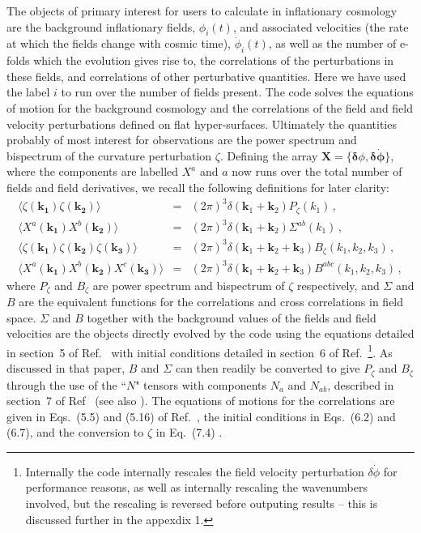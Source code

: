 \documentclass[10pt,
amsmath,amssymb,
aps,prd,nofootinbib,eqsecnum,a4paper]{revtex4}
\begin{document}
The objects of primary interest for users to calculate in inflationary cosmology are the background inflationary 
fields, $\phi_i(t)$, and associated velocities (the rate at which the fields change with cosmic time), $\dot \phi_i(t)$,
as well as the number of e-folds which the evolution gives rise to, the correlations of the perturbations in these fields, 
and correlations of other perturbative quantities.  Here we have used the label $i$ 
to run over the number of fields present. 
The code solves the equations of motion for the background cosmology and 
the correlations of the field and field velocity perturbations 
defined on flat hyper-surfaces. Ultimately the quantities 
probably of most interest for observations are the power spectrum and bispectrum 
of the curvature perturbation $\zeta$. 
Defining the array ${\mathbf X} = \{{\mathbf \delta \phi}, \mathbf {\delta \dot \phi} \}$, where 
the components are labelled $X^a$ and $a$ now runs over the total number of fields and field derivatives, 
we recall the following definitions for later clarity:
\begin{eqnarray}
\langle \zeta(\mathbf{k_1}) \zeta(\mathbf{k_2})  \rangle &=& (2\pi)^3 \delta(\mathbf{k}_1 + \mathbf{k}_2 )
        P_\zeta(k_1) \,, \\
\langle X^a(\mathbf{k_1}) X^b(\mathbf{k_2})  \rangle &=& (2\pi)^3 \delta(\mathbf{k}_1 + \mathbf{k}_2 )
        \Sigma^{ab}(k_1) \,, \\
\langle \zeta(\mathbf{k_1}) \zeta(\mathbf{k_2}) \zeta(\mathbf{k_3}) \rangle &=& (2\pi)^3 \delta(\mathbf{k}_1 + \mathbf{k}_2 + \mathbf{k}_3)
        B_\zeta(k_1, k_2, k_3) \,, \\
\langle X^a(\mathbf{k_1}) X^b(\mathbf{k_2}) X^c(\mathbf{k_3}) \rangle &=& (2\pi)^3 \delta(\mathbf{k}_1 + \mathbf{k}_2 + \mathbf{k}_3)
        B^{abc}(k_1, k_2, k_3) \,, 
\end{eqnarray}
where $P_\zeta$ and $B_\zeta$ are power spectrum and bispectrum of $\zeta$ respectively, 
and $\Sigma$ and $B$ are 
the equivalent functions for the correlations and cross correlations in field space. 
$\Sigma$ and $B$ together with the background 
values of the fields and field velocities are the objects directly evolved by the code using the equations 
detailed in section~5 of Ref.~\cite{xxx} with 
initial conditions 
detailed in section~6 of Ref.~\cite{xxx}\footnote{Internally the code internally rescales 
the field velocity perturbation $\delta \dot \phi$ for 
performance reasons, as well as internally rescaling the wavenumbers involved, but the rescaling is reversed before 
outputing results -- this is discussed further in the appexdix 1.}. As 
discussed in that paper, $B$ and $\Sigma$ can then 
readily be converted to give $P_\zeta$ and $B_\zeta$ through the use of the ``$N$" tensors with components $N_a$ and $N_{ab}$, 
described in section~7 of Ref~\cite{xxx} (see also \cite{Dias:2014msa}). 
The equations of motions for the correlations 
are given in Eqs.~(5.5) and (5.16) of  Ref.~\cite{xxx}, the initial conditions in Eqs.~(6.2) and (6.7),
and the conversion to $\zeta$ in 
Eq.~(7.4) .
\end{document}
